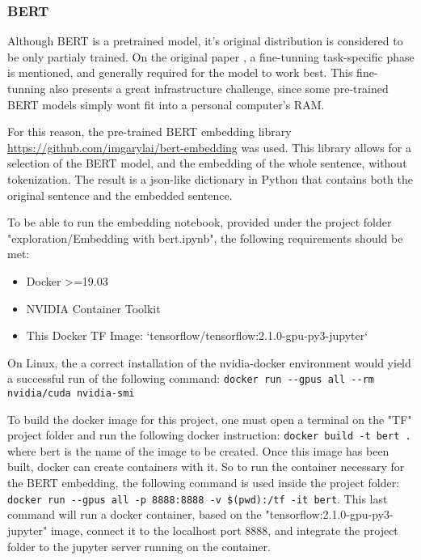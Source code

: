 \subsubsection{BERT}\label{subs:BERT}
Although BERT is a pretrained model, it's original distribution is considered to be only partialy trained. On the original paper \cite{TODO}, a fine-tunning task-specific phase is mentioned, and generally required for the model to work best. This fine-tunning also presents a great infrastructure challenge, since some pre-trained BERT models simply wont fit into a personal computer's RAM.

For this reason, the pre-trained BERT embedding library \url{https://github.com/imgarylai/bert-embedding} was used. This library allows for a selection of the BERT model, and the embedding of the whole sentence, without tokenization. The result is a json-like dictionary in Python that contains both the original sentence and the embedded sentence.

To be able to run the embedding notebook, provided under the project folder "exploration/Embedding with bert.ipynb", the following requirements should be met:
\begin{itemize}
  \item Docker >=19.03
  \item NVIDIA Container Toolkit
  \item This Docker TF Image: `tensorflow/tensorflow:2.1.0-gpu-py3-jupyter`
\end{itemize}

On Linux, the a correct installation of the nvidia-docker environment would yield a successful run of the following command: \lstinline{docker run --gpus all --rm nvidia/cuda nvidia-smi}

To build the docker image for this project, one must open a terminal on the "TF" project folder and run the following docker instruction: \lstinline{docker build -t bert .} where bert is the name of the image to be created.
Once this image has been built, docker can create containers with it. So to run the container necessary for the BERT embedding, the following command is used inside the project folder: \lstinline{docker run --gpus all -p 8888:8888 -v $(pwd):/tf -it bert}.
This last command will run a docker container, based on the "tensorflow:2.1.0-gpu-py3-jupyter" image, connect it to the localhost port 8888, and integrate the project folder to the jupyter server running on the container.


